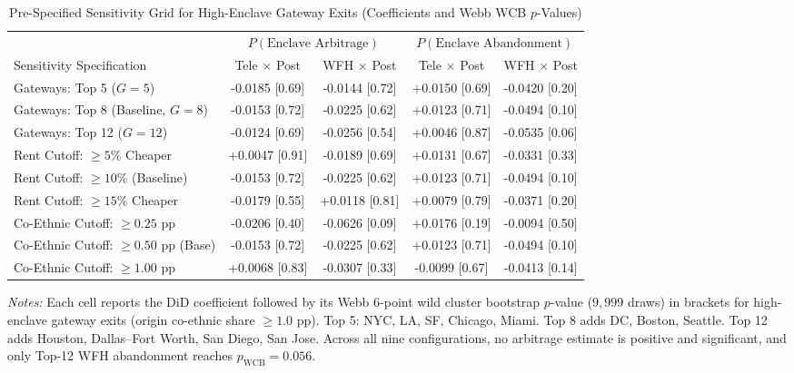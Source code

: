\begin{table}[t!]
\centering
\caption{Pre-Specified Sensitivity Grid for High-Enclave Gateway Exits (Coefficients and Webb WCB $p$-Values)}
\label{tab:sensitivity_grid}
\footnotesize
\renewcommand{\arraystretch}{1.05}
\begin{tabular}{lcccc}
\toprule
 & \multicolumn{2}{c}{$P(\text{Enclave Arbitrage})$} & \multicolumn{2}{c}{$P(\text{Enclave Abandonment})$} \\
\cmidrule(lr){2-3}\cmidrule(lr){4-5}
Sensitivity Specification & Tele $\times$ Post & WFH $\times$ Post & Tele $\times$ Post & WFH $\times$ Post \\
\midrule
Gateways: Top 5 ($G=5$) & -0.0185 [0.69] & -0.0144 [0.72] & +0.0150 [0.69] & -0.0420 [0.20] \\
Gateways: Top 8 (Baseline, $G=8$) & -0.0153 [0.72] & -0.0225 [0.62] & +0.0123 [0.71] & -0.0494 [0.10] \\
Gateways: Top 12 ($G=12$) & -0.0124 [0.69] & -0.0256 [0.54] & +0.0046 [0.87] & -0.0535 [0.06] \\
\midrule
Rent Cutoff: $\ge 5\%$ Cheaper & +0.0047 [0.91] & -0.0189 [0.69] & +0.0131 [0.67] & -0.0331 [0.33] \\
Rent Cutoff: $\ge 10\%$ (Baseline) & -0.0153 [0.72] & -0.0225 [0.62] & +0.0123 [0.71] & -0.0494 [0.10] \\
Rent Cutoff: $\ge 15\%$ Cheaper & -0.0179 [0.55] & +0.0118 [0.81] & +0.0079 [0.79] & -0.0371 [0.20] \\
\midrule
Co-Ethnic Cutoff: $\ge 0.25$ pp & -0.0206 [0.40] & -0.0626 [0.09] & +0.0176 [0.19] & -0.0094 [0.50] \\
Co-Ethnic Cutoff: $\ge 0.50$ pp (Base) & -0.0153 [0.72] & -0.0225 [0.62] & +0.0123 [0.71] & -0.0494 [0.10] \\
Co-Ethnic Cutoff: $\ge 1.00$ pp & +0.0068 [0.83] & -0.0307 [0.33] & -0.0099 [0.67] & -0.0413 [0.14] \\
\bottomrule
\end{tabular}
\begin{minipage}{0.96\linewidth}
\footnotesize\textit{Notes:} Each cell reports the DiD coefficient followed by its Webb 6-point wild cluster bootstrap $p$-value ($9{,}999$ draws) in brackets for high-enclave gateway exits (origin co-ethnic share $\ge 1.0$ pp). Top 5: NYC, LA, SF, Chicago, Miami. Top 8 adds DC, Boston, Seattle. Top 12 adds Houston, Dallas--Fort Worth, San Diego, San Jose. Across all nine configurations, no arbitrage estimate is positive and significant, and only Top-12 WFH abandonment reaches $p_{\text{WCB}} = 0.056$.
\end{minipage}
\end{table}
